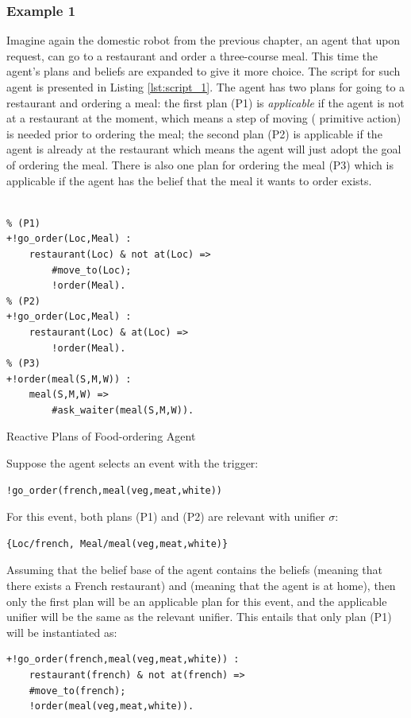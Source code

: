 \subsubsection*{Example 1}
Imagine again the domestic robot from the previous chapter, an agent that upon request, can go to a restaurant and order a three-course meal. This time the agent's plans and beliefs are expanded to give it more choice. The script for such agent is presented in Listing \ref{lst:script_1}.
The agent has two plans for going to a restaurant and ordering a meal: the first plan (P1) is \textit{applicable} if the agent is not at a restaurant at the moment, which means a step of moving ( primitive action) is needed prior to ordering the meal; the second plan (P2) is applicable if the agent is already at the restaurant which means the agent will just adopt the goal of ordering the meal. There is also one plan for ordering the meal (P3) which is applicable if the agent has the belief that the meal it wants to order exists.
\begin{listing}[t]
\centering
\begin{verbatim}

% (P1) 
+!go_order(Loc,Meal) :
    restaurant(Loc) & not at(Loc) =>
        #move_to(Loc);
        !order(Meal).
% (P2) 
+!go_order(Loc,Meal) :
    restaurant(Loc) & at(Loc) => 
        !order(Meal). 
% (P3) 
+!order(meal(S,M,W)) : 
    meal(S,M,W) => 
        #ask_waiter(meal(S,M,W)).
\end{verbatim}
    \caption{Reactive Plans of Food-ordering Agent}
    \label{lst:script_1}
\end{listing}%
\noindent Suppose the agent selects an event with the trigger: 
\begin{verbatim}
!go_order(french,meal(veg,meat,white))
\end{verbatim}
For this event, both plans (P1) and (P2) are relevant with unifier $\sigma$:
\begin{verbatim}
{Loc/french, Meal/meal(veg,meat,white)}
\end{verbatim}
Assuming that the belief base of the agent contains the beliefs  (meaning that there exists a French restaurant) and  (meaning that the agent is at home), then only the first plan will be an applicable plan for this event, and the applicable unifier will be the same as the relevant unifier. This entails that only plan (P1) will be instantiated as: 
\begin{verbatim}
+!go_order(french,meal(veg,meat,white)) :
    restaurant(french) & not at(french) =>
    #move_to(french);
    !order(meal(veg,meat,white)).
\end{verbatim}

